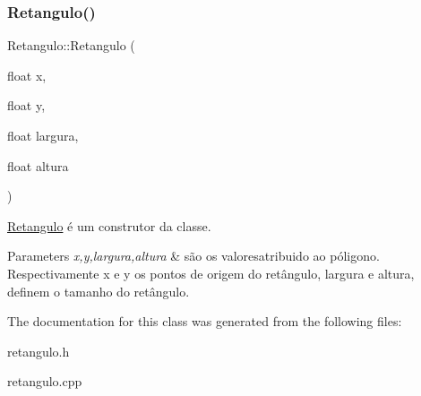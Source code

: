 \subsubsection{\texorpdfstring{Retangulo()}{Retangulo()}}
{\footnotesize\ttfamily Retangulo\+::\+Retangulo (\begin{DoxyParamCaption}\item[{float}]{x,  }\item[{float}]{y,  }\item[{float}]{largura,  }\item[{float}]{altura }\end{DoxyParamCaption})}



\mbox{\hyperlink{class_retangulo}{Retangulo}} é um construtor da classe. 


\begin{DoxyParams}{Parameters}
{\em x,y,largura,altura} & são os valoresatribuido ao póligono. Respectivamente x e y os pontos de origem do retângulo, largura e altura, definem o tamanho do retângulo. \\
\hline
\end{DoxyParams}


The documentation for this class was generated from the following files\+:\begin{DoxyCompactItemize}
\item 
retangulo.\+h\item 
retangulo.\+cpp\end{DoxyCompactItemize}
